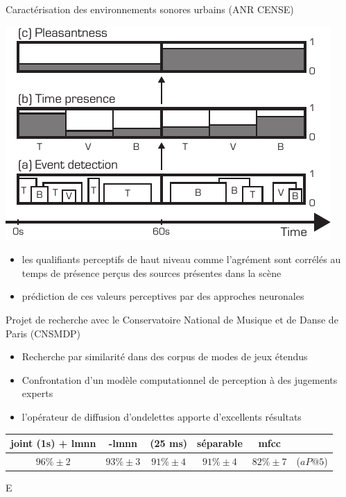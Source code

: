 \begin{frame}{Caractérisation des environnements sonores urbains (ANR CENSE)}
\begin{center}
\includegraphics[width=.4\columnwidth]{figures/block} \\
\end{center}
\begin{itemize}
\item les qualifiants perceptifs de haut niveau comme l'agrément sont corrélés au temps de présence perçus des sources présentes dans la scène
\item prédiction de ces valeurs perceptives par des approches neuronales
\end{itemize}

\end{frame}

\begin{frame}{Projet de recherche avec le Conservatoire National de Musique et de Danse de Paris (CNSMDP)}
\begin{itemize}
\item Recherche par similarité dans des corpus de modes de jeux étendus
\item Confrontation d'un modèle computationnel de perception à des jugements experts
\item l'opérateur de diffusion d'ondelettes apporte d'excellents résultats
\end{itemize}
\begin{table}
\small
    \centering 
    
\begin{tabular}{c|ccccc}
 joint (1s) + lmnn & -lmnn & (25 ms) &  séparable & mfcc & \\
      \hline
 $96\% \pm 2$ & $93\% \pm 3$ & $91\% \pm 4$ & $91\% \pm 4$ & $82\% \pm 7$ & ($aP@5$)\\
\end{tabular}
\end{table}

\end{frame}


E

